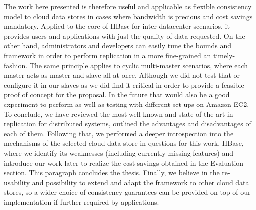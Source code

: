 The work here presented is therefore useful and applicable as flexible consistency model to cloud data stores in cases where bandwidth is precious and cost savings mandatory. Applied to the core of HBase for inter-datacenter scenarios, it provides users and applications with just the quality of data requested. On the other hand, administrators and developers can easily tune the bounds and framework in order to perform replication in a more fine-grained an timely-fashion. The same principle applies to cyclic multi-master scenarios, where each master acts as master and slave all at once. Although we did not test that or configure it in our slaves as we did find it critical in order to provide a feasible proof of concept for the proposal. In the future that would also be a good experiment to perform as well as testing with different set ups on Amazon EC2. To conclude, we have reviewed the most well-known and state of the art in replication for distributed systems, outlined the advantages and disadvantages of each of them. Following that, we performed a deeper introspection into the mechanisms of the selected cloud data store in questions for this work, HBase, where we identify its weaknesses (including currently missing features) and introduce our work later to realize the cost savings obtained in the Evaluation section. This paragraph concludes the thesis. Finally, we believe in the re-usability and possibility to extend and adapt the framework to other cloud data stores, so a wider choice of consistency guarantees can be provided on top of our implementation if further required by applications.


